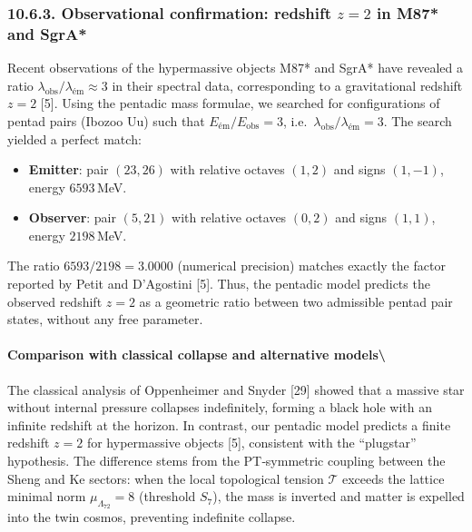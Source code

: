 \documentclass[11pt]{article}
\providecommand{\tightlist}{\setlength{\itemsep}{2pt}\setlength{\parskip}{6pt}}
\let\oldmathcal\mathcal
\renewcommand{\mathcal}[1]{\oldmathcal{#1}}
\providecommand{\tightlist}{%
  \setlength{\itemsep}{2pt}\setlength{\parskip}{6pt}
}
\begin{document}
\hypertarget{observational-confirmation-redshift-z2-in-m87-and-sgra}{%
\subsubsection{\texorpdfstring{10.6.3. Observational confirmation:
redshift \(z=2\) in M87* and
SgrA*}{10.6.3. Observational confirmation: redshift z=2 in M87* and SgrA*}}\label{observational-confirmation-redshift-z2-in-m87-and-sgra}}

Recent observations of the hypermassive objects M87* and SgrA* have
revealed a ratio
\(\lambda_{\text{obs}} / \lambda_{\text{ém}} \approx 3\) in their
spectral data, corresponding to a gravitational redshift \(z = 2\)
{[}5{]}. Using the pentadic mass formulae, we searched for
configurations of pentad pairs (Ibozoo Uu) such that
\(E_{\text{ém}} / E_{\text{obs}} = 3\),
i.e.~\(\lambda_{\text{obs}} / \lambda_{\text{ém}} = 3\). The search
yielded a perfect match:

\begin{itemize}
\tightlist
\item
  \textbf{Emitter}: pair \((23,26)\) with relative octaves \((1,2)\) and
  signs \((1,-1)\), energy \(6593\)\,MeV.
\item
  \textbf{Observer}: pair \((5,21)\) with relative octaves \((0,2)\) and
  signs \((1,1)\), energy \(2198\)\,MeV.
\end{itemize}

The ratio \(6593 / 2198 = 3.0000\) (numerical precision) matches exactly
the factor reported by Petit and D'Agostini {[}5{]}. Thus, the pentadic
model predicts the observed redshift \(z=2\) as a geometric ratio
between two admissible pentad pair states, without any free parameter.

\hypertarget{comparison-with-classical-collapse-and-alternative-models}{%
\paragraph{Comparison with classical collapse and alternative
models\textbackslash{}}\label{comparison-with-classical-collapse-and-alternative-models}}

The classical analysis of Oppenheimer and Snyder {[}29{]} showed that a
massive star without internal pressure collapses indefinitely, forming a
black hole with an infinite redshift at the horizon. In contrast, our
pentadic model predicts a finite redshift \(z=2\) for hypermassive
objects {[}5{]}, consistent with the ``plugstar'' hypothesis. The
difference stems from the PT‑symmetric coupling between the Sheng and Ke
sectors: when the local topological tension \(\mathcal{T}\) exceeds the
lattice minimal norm \(\mu_{\Lambda_{72}} = 8\) (threshold \(S_7\)), the
mass is inverted and matter is expelled into the twin cosmos, preventing
indefinite collapse.
\end{document}
